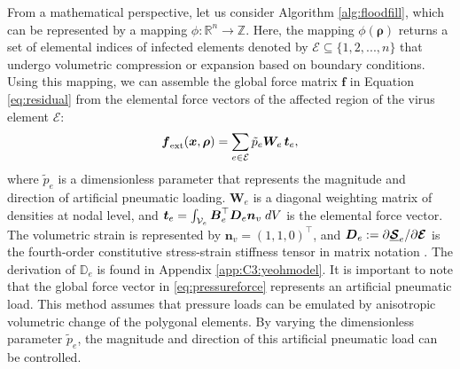 From a mathematical perspective, let us consider Algorithm \ref{alg:floodfill}, which can be represented by a mapping $\phi: \mathbb{R}^{n} \to \mathbb{Z}$. Here, the mapping $\phi(\boldsymbol{\rho})$ returns a set of elemental indices of infected elements denoted by $\mathcal{E} \subseteq \{1,2,...,n\}$ that undergo volumetric compression or expansion based on boundary conditions. Using this mapping, we can assemble the global force matrix $\boldsymbol{f}$ in Equation \eqref{eq:residual} from the elemental force vectors of the affected region of the virus element $\mathcal{E}$:
%
\begin{equation}
{\boldsymbol{f}}_{\textrm{ext}}(\boldsymbol{x},\boldsymbol{\rho}) = \sum_{e \in \mathcal{E}} \tilde{p}_e \boldsymbol{W}_{\!e} \, \boldsymbol{t}_{e}, \label{eq:pressureforce}
\end{equation}
%
where $\tilde{p}_e$ is a dimensionless parameter that represents the magnitude and direction of artificial pneumatic loading. $\boldsymbol{W}_{\!e}$ is a diagonal weighting matrix of densities at nodal level, and $\boldsymbol{t}_e = \int_{\mathcal{V}_e} {\boldsymbol{B}}_e^\top {\boldsymbol{D}}_e {\boldsymbol{n}}_v \; dV$ is the elemental force vector. The volumetric strain is represented by $\boldsymbol{n}_{v} = (1,1,0)^\top$, and ${\boldsymbol{D}}_e := \partial \underline{\boldsymbol{\mathcal{S}}}_{e}/\partial \boldsymbol{\mathcal{E}}$ is the fourth-order constitutive stress-strain stiffness tensor in matrix notation \cite{Renaud2011}. The derivation of $\mathbb{D}_e$ is found in Appendix \ref{app:C3:yeohmodel}. It is important to note that the global force vector in \eqref{eq:pressureforce} represents an artificial pneumatic load. This method assumes that pressure loads can be emulated by anisotropic volumetric change of the polygonal elements. By varying the dimensionless parameter $\tilde{p}_e$, the magnitude and direction of this artificial pneumatic load can be controlled.

